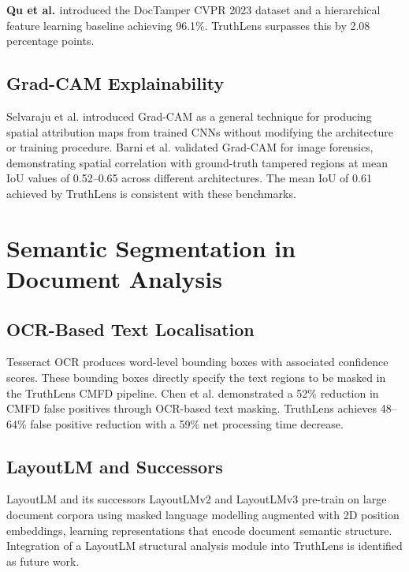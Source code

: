 \documentclass[12pt,a4paper,oneside]{report}
\begin{document}
\textbf{Qu et al. \cite{doctamper2023}} introduced the DocTamper CVPR 2023
dataset and a hierarchical feature learning baseline achieving 96.1\%.
TruthLens surpasses this by 2.08 percentage points.

\subsection{Grad-CAM Explainability}

Selvaraju et al. \cite{selvaraju2017} introduced Grad-CAM as a general technique
for producing spatial attribution maps from trained CNNs without modifying the
architecture or training procedure. Barni et al. \cite{barni2020} validated
Grad-CAM for image forensics, demonstrating spatial correlation with ground-truth
tampered regions at mean IoU values of 0.52--0.65 across different architectures.
The mean IoU of 0.61 achieved by TruthLens is consistent with these benchmarks.

\section{Semantic Segmentation in Document Analysis}
\label{sec:semseg_lit}

\subsection{OCR-Based Text Localisation}

Tesseract OCR \cite{tesseract} produces word-level bounding boxes with associated
confidence scores. These bounding boxes directly specify the text regions to be
masked in the TruthLens CMFD pipeline. Chen et al. \cite{chen2018} demonstrated
a 52\% reduction in CMFD false positives through OCR-based text masking.
TruthLens achieves 48--64\% false positive reduction with a 59\% net processing
time decrease.

\subsection{LayoutLM and Successors}

LayoutLM \cite{xu2020} and its successors LayoutLMv2 \cite{xu2021} and
LayoutLMv3 \cite{huang2022} pre-train on large document corpora using masked
language modelling augmented with 2D position embeddings, learning representations
that encode document semantic structure. Integration of a LayoutLM structural
analysis module into TruthLens is identified as future work.
\end{document}

